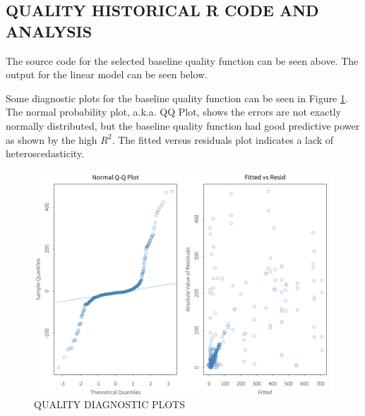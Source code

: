 \documentclass[SDSUThesis.tex]{subfiles}
\begin{document}
    \subsection{QUALITY HISTORICAL R CODE AND ANALYSIS}
    \label{app:quality-history}
        
        The source code for the selected baseline quality function
        can be seen above. The output for the linear model can be seen below.
        
        
        Some diagnostic plots for the baseline quality function
        can be seen in Figure \ref{fig:quality-diag}.  The normal probability plot,
        a.k.a. QQ Plot, shows the errors are not exactly normally distributed, but
        the baseline quality function had good predictive power as shown by the
        high $R^2$. The fitted versus
        residuals plot indicates a lack of heteroscedasticity.  
        \begin{figure}[ht]
            \centering
            \includegraphics[scale=.25]{images/quality_diag.png}
            \caption{QUALITY DIAGNOSTIC PLOTS}
            \label{fig:quality-diag}
        \end{figure}
        
\end{document}
